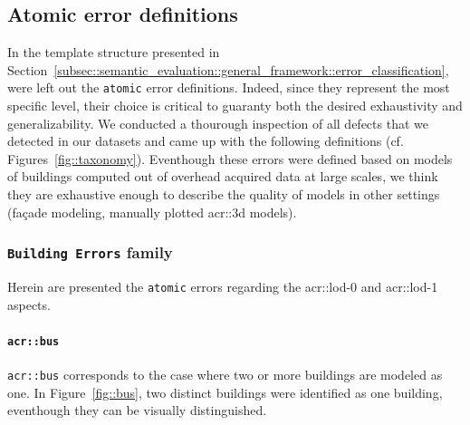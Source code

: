     \subsection{Atomic error definitions}
        \label{subsec::semantic_evaluation::overhead::atomic}
        In the template structure presented in Section~\ref{subsec::semantic_evaluation::general_framework::error_classification}, were left out the \texttt{atomic} error definitions.
        Indeed, since they represent the most specific level, their choice is critical to guaranty both the desired exhaustivity and generalizability.
        We conducted a thourough inspection of all defects that we detected in our datasets and came up with the following definitions (cf. Figures~\ref{fig::taxonomy}).
        Eventhough these errors were defined based on models of buildings computed out of overhead acquired data at large scales, we think they are exhaustive enough to describe the quality of models in other settings (fa\c{c}ade modeling, manually plotted \gls{acr::3d} models).

        \subsubsection{\texttt{Building Errors} family}
            Herein are presented the \texttt{atomic} errors regarding the \gls{acr::lod}-0 and \gls{acr::lod}-1 aspects.

            \paragraph{\texttt{\acrlong*{acr::bus}}}
                \texttt{\gls{acr::bus}} corresponds to the case where two or more buildings are modeled as one.
                In Figure~\ref{fig::bus}, two distinct buildings were identified as one building, eventhough they can be visually distinguished.\\

